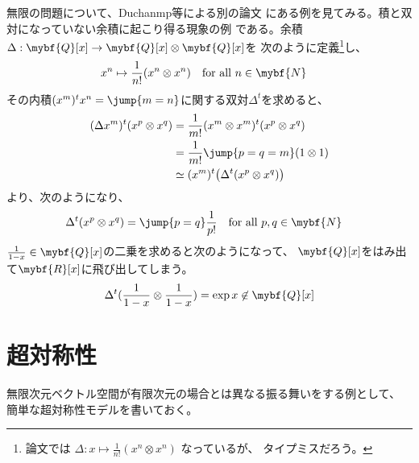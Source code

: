 	無限の問題について、Duchanmp等による別の論文\cite{arxiv:0712.0125}
	にある例を見てみる。積と双対になっていない余積に起こり得る現象の例
	である。余積$\Delta:\mybf{Q}[x]\to\mybf{Q}[x]\otimes\mybf{Q}[x]$を
	次のように定義\footnote{
		論文\cite{arxiv:0712.0125}では
		$\Delta:x\mapsto \frac{1}{n!}(x^n\otimes x^n)$ なっているが、
		タイプミスだろう。
	}し、
	\begin{equation*}\begin{split} %
		x^n &\mapsto \frac{1}{n!}(x^n\otimes x^n) 
			\quad\text{for all }n\in\mybf{N}
	\end{split}\end{equation*} %
	その内積$(x^m)^tx^n=\jump{m=n}$に関する双対$\Delta^t$を求めると、
	\begin{equation*}\begin{split} %
		(\Delta x^m)^t(x^p\otimes x^q) 
			&= \frac{1}{m!}(x^m\otimes x^m)^t(x^p\otimes x^q) \\
			&= \frac{1}{m!}\jump{p=q=m}(1\otimes 1) \\
			&\simeq (x^m)^t\bigl(\Delta^t(x^p\otimes x^q)\bigr) \\
	\end{split}\end{equation*} %
	より、次のようになり、
	\begin{equation*}\begin{split} %
		\Delta^t(x^p\otimes x^q) &= \jump{p=q}\frac{1}{p!}
		\quad\text{for all }p,q\in \mybf{N}
	\end{split}\end{equation*} %
	$\frac{1}{1-x}\in \mybf{Q}[x]$の二乗を求めると次のようになって、
	$\mybf{Q}[x]$をはみ出て$\mybf{R}[x]$に飛び出してしまう。
	\begin{equation*}\begin{split} %
		\Delta^t(\frac{1}{1-x}\otimes \frac{1}{1-x}) = \exp x \not\in \mybf{Q}[x] \\
	\end{split}\end{equation*} %

\section{超対称性}\label{s1:超対称性} %
	無限次元ベクトル空間が有限次元の場合とは異なる振る舞いをする例として、
	簡単な超対称性モデルを書いておく。

